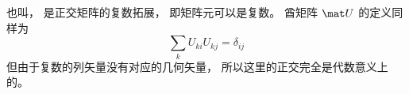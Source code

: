 
也叫， 是正交矩阵的复数拓展， 即矩阵元可以是复数。 酋矩阵 $\mat U$ 的定义同样为
\begin{equation}
\sum_k U_{ki} U_{kj} = \delta_{ij}
\end{equation}
但由于复数的列矢量没有对应的几何矢量， 所以这里的正交完全是代数意义上的。
